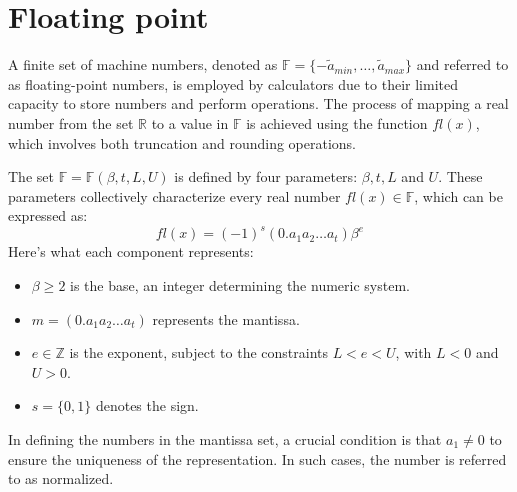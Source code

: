 \section{Floating point}

A finite set of machine numbers, denoted as $\mathbb{F}=\{-\tilde{a}_{min},\dots,\tilde{a}_{max}\}$ and referred to as floating-point numbers, is employed by calculators due to their limited capacity to store numbers and perform operations.
The process of mapping a real number from the set $\mathbb{R}$ to a value in $\mathbb{F}$ is achieved using the function $fl(x)$, which involves both truncation and rounding operations.

The set $\mathbb{F}=\mathbb{F}(\beta,t,L,U)$ is defined by four parameters: $\beta,t,L$ and $U$. 
These parameters collectively characterize every real number $fl(x) \in \mathbb{F}$, which can be expressed as:
\[fl(x)=(-1)^s(0.a_1a_2\dots a_t)\beta^e\]
Here's what each component represents:
\begin{itemize}
    \item $\beta \geq 2$ is the base, an integer determining  the numeric system. 
    \item $m=(0.a_1a_2\dots a_t)$ represents the mantissa.
    \item $e \in \mathbb{Z}$ is the exponent, subject to the constraints $L<e<U$, with $L<0$ and $U>0$. 
    \item $s=\{0,1\}$ denotes the sign.
\end{itemize}
In defining the numbers in the mantissa set, a crucial condition is that $a_1 \neq 0$ to ensure the uniqueness of the representation. 
In such cases, the number is referred to as normalized.

